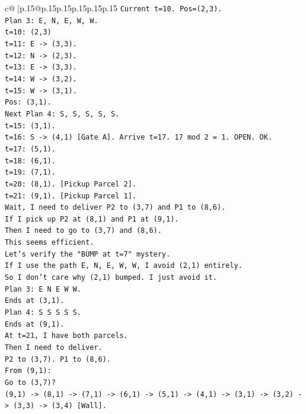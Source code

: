 \documentclass{article}
\begin{document}
{\begin{supertabular}{c@{$\;$}|p{.15\linewidth}@{}p{.15\linewidth}p{.15\linewidth}p{.15\linewidth}p{.15\linewidth}p{.15\linewidth}}
{{{\texttt{Current t=10. Pos=(2,3).} \\
\texttt{Plan 3: E, N, E, W, W.} \\
\texttt{t=10: (2,3)} \\
\texttt{t=11: E {-}> (3,3).} \\
\texttt{t=12: N {-}> (2,3).} \\
\texttt{t=13: E {-}> (3,3).} \\
\texttt{t=14: W {-}> (3,2).} \\
\texttt{t=15: W {-}> (3,1).} \\
\texttt{Pos: (3,1).} \\
\texttt{Next Plan 4: S, S, S, S, S.} \\
\texttt{t=15: (3,1).} \\
\texttt{t=16: S {-}> (4,1) {[}Gate A{]}. Arrive t=17. 17 mod 2 = 1. OPEN. OK.} \\
\texttt{t=17: (5,1).} \\
\texttt{t=18: (6,1).} \\
\texttt{t=19: (7,1).} \\
\texttt{t=20: (8,1). {[}Pickup Parcel 2{]}.} \\
\texttt{t=21: (9,1). {[}Pickup Parcel 1{]}.} \\
\texttt{Wait, I need to deliver P2 to (3,7) and P1 to (8,6).} \\
\texttt{If I pick up P2 at (8,1) and P1 at (9,1).} \\
\texttt{Then I need to go to (3,7) and (8,6).} \\
\texttt{This seems efficient.} \\
\texttt{Let's verify the "BUMP at t=7" mystery.} \\
\texttt{If I use the path E, N, E, W, W, I avoid (2,1) entirely.} \\
\texttt{So I don't care why (2,1) bumped. I just avoid it.} \\
\texttt{Plan 3: E N E W W.} \\
\texttt{Ends at (3,1).} \\
\texttt{Plan 4: S S S S S.} \\
\texttt{Ends at (9,1).} \\
\texttt{At t=21, I have both parcels.} \\
\texttt{Then I need to deliver.} \\
\texttt{P2 to (3,7). P1 to (8,6).} \\
\texttt{From (9,1):} \\
\texttt{Go to (3,7)?} \\
\texttt{(9,1) {-}> (8,1) {-}> (7,1) {-}> (6,1) {-}> (5,1) {-}> (4,1) {-}> (3,1) {-}> (3,2) {-}> (3,3) {-}> (3,4) {[}Wall{]}.} \\
}}}
\end{supertabular}}
\end{document}
